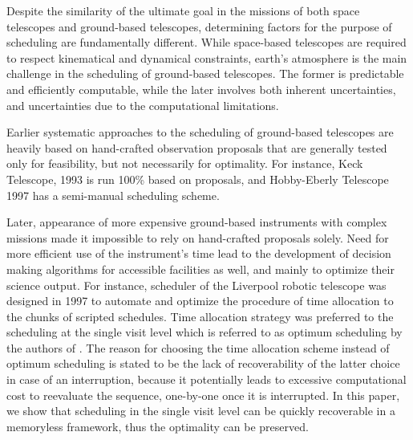 \documentclass[12pt]{aastex62}
\theoremstyle{definition}
\begin{document}
Despite the similarity of the ultimate goal in the missions of both space telescopes and ground-based telescopes, determining factors for the purpose of scheduling are fundamentally different. While space-based telescopes are required to respect kinematical and dynamical constraints, earth's atmosphere is the main challenge in the scheduling of ground-based telescopes. The former is predictable and efficiently computable, while the later involves both inherent uncertainties, and uncertainties due to the computational limitations. 

Earlier systematic approaches to the scheduling of ground-based telescopes are heavily based on hand-crafted observation proposals that are generally tested only for feasibility, but not necessarily for optimality. For instance,  Keck Telescope, 1993 \citep{nelson1985design} is run 100\% based on proposals, and Hobby-Eberly Telescope 1997 \citep{shetrone2007ten} has a semi-manual scheduling scheme. 

Later, appearance of more expensive ground-based instruments with complex missions made it impossible to rely on hand-crafted proposals solely. Need for more efficient use of the instrument's time lead to the development of decision making algorithms for accessible facilities as well, and mainly to optimize their science output. For instance, scheduler of the Liverpool robotic telescope was designed in 1997 to automate and optimize the procedure of time allocation to the chunks of scripted schedules. Time allocation strategy was preferred to the scheduling at the single visit level which is referred to as optimum scheduling by the authors of \citep{steele1997control}. The reason for choosing the time allocation scheme instead of optimum scheduling is stated to be the lack of recoverability of the latter choice in case of an interruption, because it potentially leads to excessive computational cost to reevaluate the sequence, one-by-one once it is interrupted. In this paper, we show that scheduling in the single visit level can be quickly recoverable in a memoryless framework, thus the optimality can be preserved.
\end{document}
